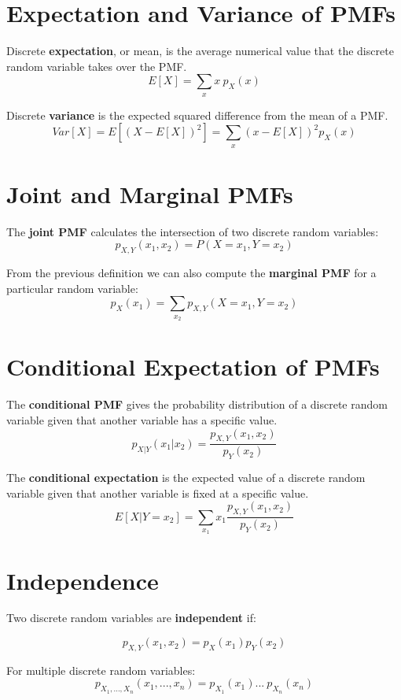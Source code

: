 \documentclass[
  letterpaper,
  DIV=11,
  numbers=noendperiod]{scrreprt}
\begin{document}
\section{Expectation and Variance of
PMFs}\label{expectation-and-variance-of-pmfs}

Discrete \textbf{expectation}, or mean, is the average numerical value
that the discrete random variable takes over the PMF. \[
E[X] = \sum_{x} x \ p_{X}(x)
\]

Discrete \textbf{variance} is the expected squared difference from the
mean of a PMF. \[
Var[X] = E[(X - E[X])^{2}] = \sum_{x}(x - E[X])^2 p_{X}(x)
\]

\section{Joint and Marginal PMFs}\label{joint-and-marginal-pmfs}

The \textbf{joint PMF} calculates the intersection of two discrete
random variables: \[
p_{X,Y}(x_{1},x_{2}) = P(X = x_{1}, Y = x_{2})
\]

From the previous definition we can also compute the \textbf{marginal
PMF} for a particular random variable: \[
p_{X}(x_{1}) = \sum_{x_{2}} p_{X,Y}(X = x_{1},Y = x_{2})
\]

\section{Conditional Expectation of
PMFs}\label{conditional-expectation-of-pmfs}

The \textbf{conditional PMF} gives the probability distribution of a
discrete random variable given that another variable has a specific
value. \[
p_{X|Y}(x_{1}| x_{2}) = \frac{p_{X,Y}(x_{1}, x_{2})}{p_{Y}(x_{2})}
\]

The \textbf{conditional expectation} is the expected value of a discrete
random variable given that another variable is fixed at a specific
value. \[
E[X| Y = x_{2}] = \sum_{x_{1}} x_{1} \frac{p_{X,Y}(x_{1}, x_{2})}{p_{Y}(x_{2})}
\]

\section{Independence}\label{independence-1}

Two discrete random variables are \textbf{independent} if:

\[
p_{X,Y}(x_{1}, x_{2}) = p_{X}(x_{1}) p_{Y}(x_{2})
\]

For multiple discrete random variables: \[
p_{X_{1},...,X_{n}}(x_{1}, ..., x_{n}) = p_{X_{1}}(x_{1}) ... \ p_{X_{n}}(x_{n})
\]
\end{document}
